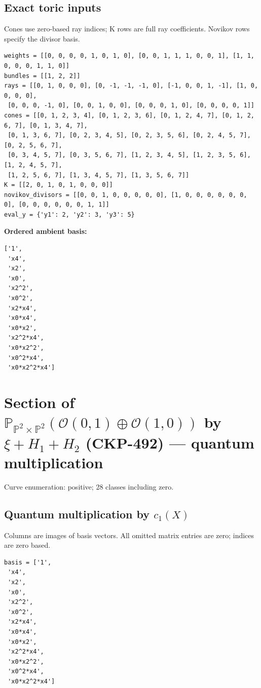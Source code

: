 \documentclass[10pt,a4paper]{article}
\begin{document}
\subsection*{Exact toric inputs}
Cones use zero-based ray indices; K rows are full ray coefficients. Novikov rows specify the divisor basis.

\begin{lstlisting}
weights = [[0, 0, 0, 0, 1, 0, 1, 0], [0, 0, 1, 1, 1, 0, 0, 1], [1, 1, 0, 0, 0, 1, 1, 0]]
bundles = [[1, 2, 2]]
rays = [[0, 1, 0, 0, 0], [0, -1, -1, -1, 0], [-1, 0, 0, 1, -1], [1, 0, 0, 0, 0],
 [0, 0, 0, -1, 0], [0, 0, 1, 0, 0], [0, 0, 0, 1, 0], [0, 0, 0, 0, 1]]
cones = [[0, 1, 2, 3, 4], [0, 1, 2, 3, 6], [0, 1, 2, 4, 7], [0, 1, 2, 6, 7], [0, 1, 3, 4, 7],
 [0, 1, 3, 6, 7], [0, 2, 3, 4, 5], [0, 2, 3, 5, 6], [0, 2, 4, 5, 7], [0, 2, 5, 6, 7],
 [0, 3, 4, 5, 7], [0, 3, 5, 6, 7], [1, 2, 3, 4, 5], [1, 2, 3, 5, 6], [1, 2, 4, 5, 7],
 [1, 2, 5, 6, 7], [1, 3, 4, 5, 7], [1, 3, 5, 6, 7]]
K = [[2, 0, 1, 0, 1, 0, 0, 0]]
novikov_divisors = [[0, 0, 1, 0, 0, 0, 0, 0], [1, 0, 0, 0, 0, 0, 0, 0], [0, 0, 0, 0, 0, 0, 1, 1]]
eval_y = {'y1': 2, 'y2': 3, 'y3': 5}
\end{lstlisting}

\textbf{Ordered ambient basis:}
\begin{lstlisting}
['1',
 'x4',
 'x2',
 'x0',
 'x2^2',
 'x0^2',
 'x2*x4',
 'x0*x4',
 'x0*x2',
 'x2^2*x4',
 'x0*x2^2',
 'x0^2*x4',
 'x0*x2^2*x4']
\end{lstlisting}

\clearpage\section*{Section of $\mathbb P_{\mathbb P^{2}\times \mathbb P^{2}}(\mathcal O(0,1)\oplus \mathcal O(1,0))$ by $\xi +H_{1}+H_{2}$ (CKP-492) --- quantum multiplication}

Curve enumeration: positive; 28 classes including zero.
\subsection*{Quantum multiplication by $c_1(X)$}
Columns are images of basis vectors. All omitted matrix entries are zero; indices are zero based.

\begin{lstlisting}
basis = ['1',
 'x4',
 'x2',
 'x0',
 'x2^2',
 'x0^2',
 'x2*x4',
 'x0*x4',
 'x0*x2',
 'x2^2*x4',
 'x0*x2^2',
 'x0^2*x4',
 'x0*x2^2*x4']
\end{lstlisting}
\end{document}
